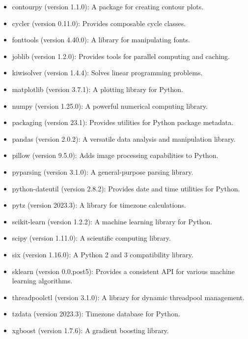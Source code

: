\begin{itemize}
\begin{itemize}
			\item contourpy (version 1.1.0): A package for creating contour plots.
			
			\item cycler (version 0.11.0): Provides composable cycle classes.
			
			\item fonttools (version 4.40.0): A library for manipulating fonts.
			
			\item joblib (version 1.2.0): Provides tools for parallel computing and caching.
			
			\item kiwisolver (version 1.4.4): Solves linear programming problems.
			
			\item matplotlib (version 3.7.1): A plotting library for Python.
			
			\item numpy (version 1.25.0): A powerful numerical computing library.
			
			\item packaging (version 23.1): Provides utilities for Python package metadata.
			
			\item pandas (version 2.0.2): A versatile data analysis and manipulation library.
			
			\item pillow (version 9.5.0): Adds image processing capabilities to Python.
			
			\item pyparsing (version 3.1.0): A general-purpose parsing library.
			
			\item python-dateutil (version 2.8.2): Provides date and time utilities for Python.
			
			\item pytz (version 2023.3): A library for timezone calculations.
			
			\item scikit-learn (version 1.2.2): A machine learning library for Python.
			
			\item scipy (version 1.11.0): A scientific computing library.
			
			\item six (version 1.16.0): A Python 2 and 3 compatibility library.
			
			\item sklearn (version 0.0.post5): Provides a consistent API for various machine learning algorithms.
			
			\item threadpoolctl (version 3.1.0): A library for dynamic threadpool management.
			
			\item tzdata (version 2023.3): Timezone database for Python.
			
			\item xgboost (version 1.7.6): A gradient boosting library.
			
		\end{itemize}
		
	\end{itemize}
